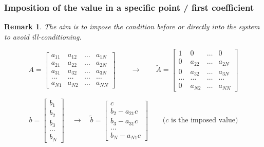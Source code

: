 \documentclass[8pt]{beamer}
\newtheorem*{remark}{Remark}
\begin{document}
\begin{frame}
\frametitle{Imposition of the value in a specific point / first coefficient}
\begin{remark}
	The aim is to impose the condition before or directly into the system to avoid ill-conditioning.
\end{remark}

\begin{equation*}
A=\begin{bmatrix}
a_{11} & a_{12} & \dots & a_{1N} \\ 
a_{21} & a_{22} & \dots & a_{2N} \\ 
a_{31} &a_{32} & \dots & a_{3N} \\
\dots & \dots & \dots & \dots \\
a_{N1}  & a_{N2} & \dots & a_{NN}
\end{bmatrix} \quad \quad \rightarrow
\quad \quad \tilde{A}=\begin{bmatrix}
1 & 0 & \dots & 0 \\ 
0 & a_{22} & \dots & a_{2N} \\ 
0 &a_{32} & \dots & a_{3N} \\
\dots & \dots & \dots & \dots \\
0  & a_{N2} & \dots & a_{NN}
\end{bmatrix}
\end{equation*}

\begin{equation*}
b=\begin{bmatrix}
b_1 \\ b_2 \\ b_3 \\ \dots \\ b_N
\end{bmatrix} \quad \rightarrow \quad
\tilde{b}=\begin{bmatrix}
c \\ b_2 -a_{21}c \\ b_3-a_{31}c \\ \dots \\ b_N-a_{N1}c
\end{bmatrix}
\quad \quad \text{($c$ is the imposed value)}
\end{equation*}
\end{frame}
\end{document}
